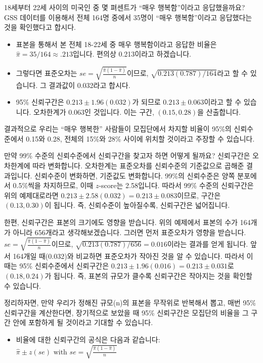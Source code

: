 \documentclass[]{book}
\providecommand{\tightlist}{%
  \setlength{\itemsep}{0pt}\setlength{\parskip}{0pt}}
\begin{document}
18세부터 22세 사이의 미국인 중 몇 펴센트가 ``매우 행복함''이라고 응답했을까요? GSS 데이터를 이용해서 전체 164명 중에서 35명이 ``매우 행복함''이라고 응답했다는 것을 확인했다고 합시다.

\begin{itemize}
\item
  표본을 통해서 본 전체 18-22세 중 매우 행복함이라고 응답한 비율은 \(\hat{\pi} = 35/164 \approx .213\)입니다. 편의상 0.213이라고 하겠습니다.
\item
  그렇다면 표준오차는 \(se = \sqrt{\frac{\hat{\pi}(1-\hat{\pi})}{n}}\)이므로, \(\sqrt{0.213(0.787)/164}\)라고 할 수 있습니다. 그 결과값이 0.032라고 합시다.
\item
  95\% 신뢰구간은 \(0.213 \pm 1.96(0.032)\)가 되므로 \(0.213 \pm 0.063\)이라고 할 수 있습니다. 오차한계가 \(0.063\)인 것입니다. 이는 구간, \((0.15, 0.28)\)을 산출합니다.
\end{itemize}

결과적으로 우리는 ``매우 행복한'' 사람들이 모집단에서 차지할 비율이 95\%의 신뢰수준에서 0.15와 0.28, 전체의 15\%와 28\% 사이에 위치할 것이라고 주장할 수 있습니다.

만약 99\% 수준의 신뢰수준에서 신뢰구간을 찾고자 하면 어떻게 될까요? 신뢰구간은 오차한계에 따라 변화합니다. 오차한계는 표준오차를 신뢰수준의 기준값으로 곱해준 결과입니다. 신뢰수준이 변화하면, 기준값도 변화합니다. 99\%의 신뢰수준은 양쪽 분포에서 0.5\%씩을 차지하므로, 이때 \(z\)-score는 2.58입니다. 따라서 99\% 수준의 신뢰구간은 위의 예제대로라면 \(0.213\pm 2.58(0.032) = 0.213\pm0.083\)이므로, 구간은 \((0.13, 0.30)\)이 됩니다. 즉, 신뢰수준이 높아질수록, 신뢰구간은 넓어집니다.

한편, 신뢰구간은 표본의 크기에도 영향을 받습니다. 위의 예제에서 표본의 수가 164개가 아니라 656개라고 생각해보겠습니다. 그러면 먼저 표준오차가 영향을 받습니다. \(se = \sqrt{\frac{\hat{\pi}(1-\hat{\pi})}{n}}\)이므로, \(\sqrt{0.213(0.787)/656} = 0.016\)이라는 결과를 얻게 됩니다. 앞서 164개일 때(0.032)와 비교하면 표준오차가 작아진 것을 알 수 있습니다. 따라서 이때는 95\% 신뢰수준에서 신뢰구간은 \(0.213\pm1.96(0.016) = 0.213\pm0.031\)로 \((0.18, 0.24)\)가 됩니다. 즉, 표본의 규모가 클수록 신뢰구간은 작아지는 것을 확인할 수 있습니다.

정리하자면, 만약 우리가 정해진 규모(n)의 표본을 무작위로 반복해서 뽑고, 매번 95\% 신뢰구간을 계산한다면, 장기적으로 보았을 때 95\% 신뢰구간은 모집단의 비율을 그 구간 안에 포함하게 될 것이라고 기대할 수 있습니다.

\begin{itemize}
\tightlist
\item
  비율에 대한 신뢰구간의 공식은 다음과 같습니다: \(\hat{\pi} \pm z(se) \text{  with  } se = \sqrt{\frac{\hat{\pi}(1-\hat{\pi})}{n}}\)
\end{itemize}
\end{document}
